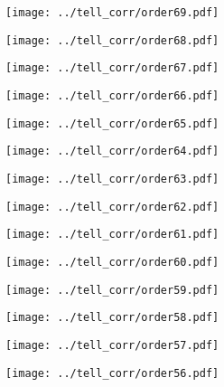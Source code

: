 \documentclass{article}
\begin{document}
\begin{figure}[H]
    \centering
    \texttt{[image: ../tell\_corr/order69.pdf]}
\end{figure}
\begin{figure}[H]
    \centering
    \texttt{[image: ../tell\_corr/order68.pdf]}
\end{figure}
\begin{figure}[H]
    \centering
    \texttt{[image: ../tell\_corr/order67.pdf]}
\end{figure}
\begin{figure}[H]
    \centering
    \texttt{[image: ../tell\_corr/order66.pdf]}
\end{figure}
\begin{figure}[H]
    \centering
    \texttt{[image: ../tell\_corr/order65.pdf]}
\end{figure}
\begin{figure}[H]
    \centering
    \texttt{[image: ../tell\_corr/order64.pdf]}
\end{figure}
\begin{figure}[H]
    \centering
    \texttt{[image: ../tell\_corr/order63.pdf]}
\end{figure}
\begin{figure}[H]
    \centering
    \texttt{[image: ../tell\_corr/order62.pdf]}
\end{figure}
\begin{figure}[H]
    \centering
    \texttt{[image: ../tell\_corr/order61.pdf]}
\end{figure}
\begin{figure}[H]
    \centering
    \texttt{[image: ../tell\_corr/order60.pdf]}
\end{figure}
\begin{figure}[H]
    \centering
    \texttt{[image: ../tell\_corr/order59.pdf]}
\end{figure}
\begin{figure}[H]
    \centering
    \texttt{[image: ../tell\_corr/order58.pdf]}
\end{figure}
\begin{figure}[H]
    \centering
    \texttt{[image: ../tell\_corr/order57.pdf]}
\end{figure}
\begin{figure}[H]
    \centering
    \texttt{[image: ../tell\_corr/order56.pdf]}
\end{figure}
\end{document}
